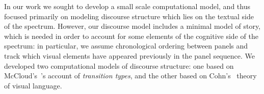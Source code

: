 %
In our work we sought to develop a small scale computational model, and thus
focused primarily on modeling discourse structure which lies on the textual
side of the spectrum. However, our discourse model includes a minimal model of
story, which is needed in order to account for some elements of the cognitive
side of the spectrum: in particular, we assume chronological ordering
between panels and track which visual elements have appeared previously in the
panel sequence.  We developed two computational models of discourse
structure: one based on McCloud's~\cite{mcCloud1993understanding}'s account
of \emph{transition types}, and the other based on
Cohn's~\cite{cohn2013visual} theory of visual language.



